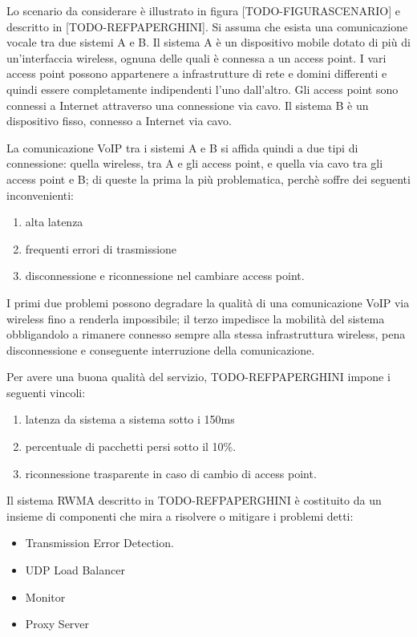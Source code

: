 \documentclass[12pt,a4paper,openright,twoside]{book}
\begin{document}
Lo scenario da considerare è illustrato in figura
[TODO-FIGURASCENARIO] e descritto in [TODO-REFPAPERGHINI]. Si assuma
che esista una comunicazione vocale tra due sistemi A e B. Il sistema
A è un dispositivo mobile dotato di più di un'interfaccia wireless,
ognuna delle quali è connessa a un access point. I vari access point
possono appartenere a infrastrutture di rete e domini differenti e
quindi essere completamente indipendenti l'uno dall'altro. Gli access
point sono connessi a Internet attraverso una connessione via cavo. Il
sistema B è un dispositivo fisso, connesso a Internet via cavo.

La comunicazione VoIP tra i sistemi A e B si affida quindi a due tipi
di connessione: quella wireless, tra A e gli access point, e quella
via cavo tra gli access point e B; di queste la prima la più
problematica, perchè soffre dei seguenti inconvenienti:

\begin{enumerate}
\item alta latenza
\item frequenti errori di trasmissione
\item disconnessione e riconnessione nel cambiare access point.
\end{enumerate}

I primi due problemi possono degradare la qualità di una comunicazione
VoIP via wireless fino a renderla impossibile; il terzo impedisce la
mobilità del sistema obbligandolo a rimanere connesso sempre alla
stessa infrastruttura wireless, pena disconnessione e conseguente
interruzione della comunicazione.

Per avere una buona qualità del servizio, TODO-REFPAPERGHINI impone i
seguenti vincoli:
\begin{enumerate}
\item latenza da sistema a sistema sotto i 150ms
\item percentuale di pacchetti persi sotto il 10\%.
\item riconnessione trasparente in caso di cambio di access point.
\end{enumerate}

Il sistema RWMA descritto in TODO-REFPAPERGHINI è costituito da un
insieme di componenti che mira a risolvere o mitigare i problemi
detti:

\begin{itemize}
\item Transmission Error Detection.
\item UDP Load Balancer
\item Monitor
\item Proxy Server
\end{itemize}
\end{document}
